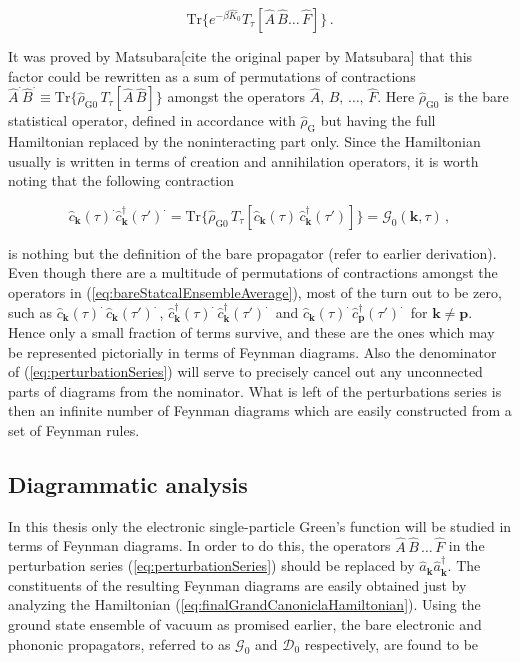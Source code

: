 \documentclass[12pt]{report}
\renewcommand{\vec}[1]{\boldsymbol{\mathbf{#1}}}                        %
\newcommand{\Gt}{\mathcal{G}}
\newcommand{\Dt}{\mathcal{D}}
\newcommand{\todo}[1]{{\leavevmode\color{todo}#1}}
\begin{document}
\begin{equation}
	\label{eq:bareStatcalEnsembleAverage}
	\text{Tr} \{ e^{-\beta \hat K_0 } T_\tau [ \hat A \, \hat B \dots\,  \hat F] \} \,.
\end{equation}

It was proved by Matsubara\todo{[cite the original paper by Matsubara]} that this factor could be rewritten as a sum of permutations of contractions $ \hat A^\cdot \hat B^\cdot \equiv \text{Tr} \{ \hat \rho_{\text{G}0} \, T_\tau [ \hat A \,\hat B ] \} $ amongst the operators $ \hat A, \, \hat B, \, \dots , \, \hat F $. Here $ \hat \rho_{\text{G}0} $ is the bare statistical operator, defined in accordance with $ \hat \rho_\text{G} $ but having the full Hamiltonian replaced by the noninteracting part only. Since the Hamiltonian usually is written in terms of creation and annihilation operators, it is worth noting that the following contraction

\begin{equation}
	\hat c_{\vec k} (\tau) ^\cdot \hat c^\dagger_{\vec k} (\tau') ^\cdot
	= \text{Tr} \{ \hat \rho_{\text{G}0} \, T_\tau [ \hat c_{\vec k} (\tau) \, \hat c^\dagger_{\vec k} (\tau') ] \}
	= \Gt_0(\vec k, \tau) \,,
\end{equation}

is nothing but the definition of the bare propagator \todo{(refer to earlier derivation)}. Even though there are a multitude of permutations of contractions amongst the operators in (\ref{eq:bareStatcalEnsembleAverage}), most of the turn out to be zero, such as $ \hat c_{\vec k}(\tau)^\cdot \, \hat c_{\vec k}(\tau')^\cdot \, $, $ \hat c^\dagger_{\vec k}(\tau)^\cdot \, \hat c^\dagger_{\vec k}(\tau')^\cdot \, $ and $ \hat c_{\vec k}(\tau)^\cdot \, \hat c^\dagger_{\vec p}(\tau')^\cdot \, $ for $ \vec k \neq \vec p $. Hence only a small fraction of terms survive, and these are the ones which may be represented pictorially in terms of Feynman diagrams. Also the denominator of (\ref{eq:perturbationSeries}) will serve to precisely cancel out any unconnected parts of diagrams from the nominator. What is left of the perturbations series is then an infinite number of Feynman diagrams which are easily constructed from a set of Feynman rules.

\subsection{Diagrammatic analysis}

In this thesis only the electronic single-particle Green's function will be studied in terms of Feynman diagrams. In order to do this, the operators $ \hat A \, \hat B \, \dots \, \hat F $ in the perturbation series (\ref{eq:perturbationSeries}) should be replaced by $ \hat a_{\vec k} \hat a^\dagger_{\vec k} $. The constituents of the resulting Feynman diagrams are easily obtained just by analyzing the Hamiltonian (\ref{eq:finalGrandCanoniclaHamiltonian}). Using the ground state ensemble of vacuum as promised earlier, the bare electronic and phononic propagators, referred to as $ \Gt_0 $ and $ \Dt_0 $ respectively, are found to be
\end{document}
